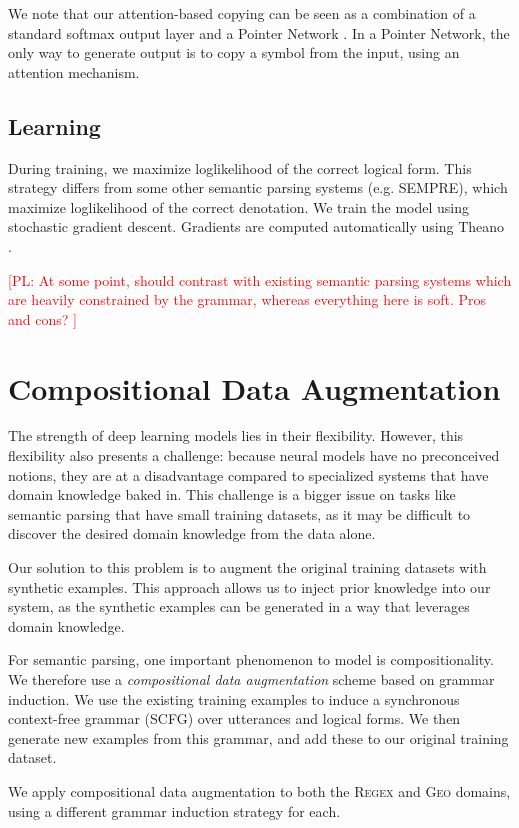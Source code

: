 \documentclass[11pt,letterpaper]{article}
\newcommand{\regex}{\textsc{Regex}\xspace}
\newcommand{\geo}{\textsc{Geo}\xspace}
\newcommand\pl[1]{\textcolor{red}{[PL: #1]}}
\begin{document}
We note that our attention-based copying can be seen as a 
combination of a standard softmax output layer
and a Pointer Network \cite{vinyals2015pointer}.  In a Pointer Network,
the only way to generate output is to copy a symbol from the input,
using an attention mechanism.

\subsection{Learning}
During training, we maximize loglikelihood of the correct
logical form.
This strategy differs from some other semantic parsing systems
(e.g. SEMPRE), which maximize loglikelihood of the correct
denotation.
We train the model using stochastic gradient descent.
Gradients are computed automatically using Theano \cite{bergstra2010theano}.

\pl{
  At some point, should contrast with existing semantic parsing systems
  which are heavily constrained by the grammar, whereas everything here is soft.
  Pros and cons?
}

\section{Compositional Data Augmentation}
The strength of deep learning models lies in their flexibility.
However, this flexibility also presents a challenge:
because neural models have no preconceived notions,
they are at a disadvantage compared to specialized systems
that have domain knowledge baked in.
This challenge is a bigger issue on tasks like semantic parsing
that have small training datasets, as
it may be difficult to discover the desired domain knowledge
from the data alone.

Our solution to this problem is to
augment the original training datasets with synthetic examples.
This approach allows us to inject prior knowledge into our system,
as the synthetic examples can be generated 
in a way that leverages domain knowledge.

For semantic parsing, one important phenomenon to model is compositionality.
We therefore use a \emph{compositional data augmentation} scheme
based on grammar induction.
We use the existing training examples to induce a
synchronous context-free grammar (SCFG) over utterances and logical forms.
We then generate new examples from this grammar,
and add these to our original training dataset.

We apply compositional data augmentation to both the \regex and \geo domains,
using a different grammar induction strategy for each.
\end{document}
